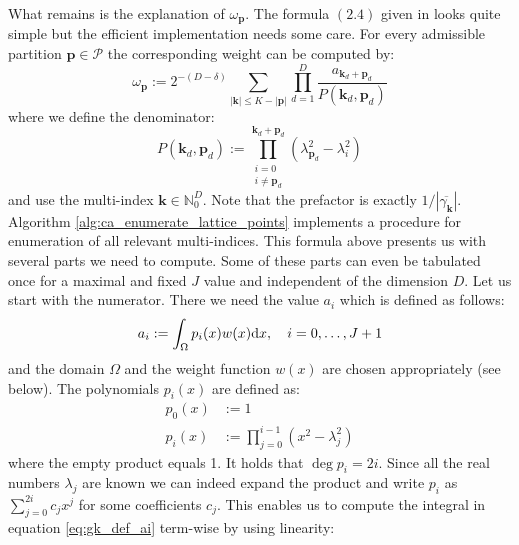 \documentclass[a4paper,10pt]{article}
\begin{document}
What remains is the explanation of $\omega_\mathbf{p}$. The formula $(2.4)$
given in \cite{genz} looks quite simple but the efficient implementation needs
some care. For every admissible partition $\mathbf{p} \in \mathcal{P}$ the
corresponding weight can be computed by:
\begin{equation} \label{eq:gk_weight_def}
  \omega_{\mathbf{p}} := 2^{-(D-\delta)}
                         \sum_{|\mathbf{k}| \leq K - |\mathbf{p}|}
                         \prod_{d=1}^{D}
                           \frac{a_{\mathbf{k}_{d}+\mathbf{p}_{d}}}{P(\mathbf{k}_{d},\mathbf{p}_{d})}
\end{equation}
where we define the denominator:
\begin{equation} \label{eq:gk_weight_def_denom}
  P(\mathbf{k}_{d},\mathbf{p}_{d}) :=
  \prod_{\substack{i=0 \\
                   i\neq\mathbf{p}_{d}}}
       ^{\mathbf{k}_{d}+\mathbf{p}_{d}}
    \left( \lambda_{\mathbf{p}_{d}}^{2}-\lambda_{i}^{2} \right)
\end{equation}
and use the multi-index $\mathbf{k} \in \mathbb{N}_{0}^{D}$. Note that the
prefactor is exactly $1 / |\overline{\gamma_\mathbf{k}}|$.
Algorithm \eqref{alg:ca_enumerate_lattice_points} implements a procedure
for enumeration of all relevant multi-indices.
This formula above presents us with several parts we need to compute.
Some of these parts can even be tabulated once for a maximal and
fixed $J$ value and independent of the dimension $D$.
Let us start with the numerator. There we need the value $a_i$ which is defined
as follows:
\begin{equation} \label{eq:gk_def_ai}
  a_{i} := \int_\Omega p_{i}(x) w(x) \mathrm{d}x, \quad i = 0, \ldots, J+1
\end{equation}
and the domain $\Omega$ and the weight function $w(x)$ are chosen
appropriately (see below). The polynomials $p_{i}(x)$ are defined as:
\begin{equation}
\begin{split}
  p_{0}(x) & := 1 \\
  p_{i}(x) & := \prod_{j=0}^{i-1} \left(x^{2} - \lambda_{j}^{2}\right)
\end{split}
\end{equation}
where the empty product equals 1. It holds that $\deg p_i = 2i$.
Since all the real numbers $\lambda_{j}$ are known we can indeed
expand the product and write $p_i$ as $\sum_{j=0}^{2i} c_j x^j$
for some coefficients $c_j$. This enables us to compute the integral
in equation \eqref{eq:gk_def_ai} term-wise by using linearity:
\end{document}
